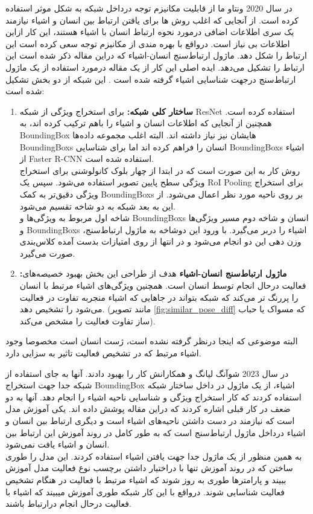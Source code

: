 در سال 2020 ونتاو ما %
\cite{Human_object_relation_action}
 از قابلیت مکانیزم توجه درداخل شبکه به شکل موثر استفاده کرده است. از آنجایی که اغلب روش ها برای یافتن ارتباط بین انسان و اشیاء نیازمند یک سری اطلاعات اضافی درمورد نحوه ارتباط انسان با اشیاء هستند،‌ این کار ازاین اطلاعات بی نیاز است. درواقع با بهره مندی از مکانیزم توجه سعی کرده است این ارتباط را شکل دهد. ماژول ارتباط‌سنج انسان-اشیاء که دراین مقاله ذکر شده است این ارتباط را تشکیل می‌دهد.
 ایده اصلی این کار از یک مقاله درمورد استفاده از یک ماژول ارتباط‌سنج درجهت شناسایی اشیاء گرفته شده است %
 \cite{Relation_network_object}
 . این شبکه از دو بخش تشکیل شده است:
\begin{enumerate}
 	\item \textbf{ساختار کلی شبکه:}
برای استخراج ویژگی از شبکه ResNet %
\cite{Resnet_article}
استفاده کرده است. همچنین از آنجایی که اطلاعات انسان و اشیاء را باهم ترکیب کرده اند،‌ به %
\gls{BoundingBox}
هایشان نیز نیاز داشته اند. البته اغلب مجموعه داده‌ها 
\glspl{BoundingBox}
 انسان را فراهم کرده اند اما برای شناسایی 
\glspl{BoundingBox}
  اشیاء از Faster R-CNN استفاده شده است.\\
روش کار به این صورت است که در ابتدا از چهار بلوک کانولوشنی برای استخراج ویژگی سطح پایین تصویر استفاده می‌شود. سپس یک RoI Pooling برای استخراج ویژگی دقیق‌تر به کمک %
\glspl{BoundingBox}
 بر روی ناحیه مورد نظر اعمال می‌شود. از این به بعد شبکه به دو شاخه تقسیم می‌شود.\\
شاخه اول مربوط به ویژگی‌ها و %
\glspl{BoundingBox}
 انسان و شاخه دوم مسیر ویژگی‌ها و %
 \glspl{BoundingBox}
  اشیاء را دربر می‌گیرد. با ورود این دوشاخه به ماژول ارتباط‌سنج،‌ وزن دهی این دو انجام می‌شود و در انتها از روی امتیازات بدست آمده کلاس‌بندی صورت می‌گیرد.
	\vspace{20pt}
 	\item \textbf{:ماژول ارتباط‌سنج انسان-اشیاء}
 هدف از طراحی این بخش بهبود خصیصه‌های فعالیت درحال انجام توسط انسان است. همچنین ویژگی‌های اشیاء مرتبط با انسان را پررنگ تر می‌کند که شبکه بتواند در جاهایی که اشیاء منجربه تفاوت در فعالیت می‌شود را تشخیص دهد. (مانند تصویر %
\ref{fig:similar_pose_diff}
 که مسواک یا حباب ساز تفاوت فعالیت را مشخص می‌کند).\\
\end{enumerate}
 البته موضوعی که اینجا درنظر گرفته نشده است،‌ ژست انسان است مخصوصا وجود اشیاء مرتبط که در تشخیص فعالیت تاثیر به سزایی دارد.
  
	در سال 2023 شوآنگ لیانگ و همکارانش %
\cite{relation_with_free_obj}
کار %
\cite{Human_object_relation_action}
را بهبود دادند. آنها به‌ جای استفاده از شبکه جدا جهت استخراج %
\gls{BoundingBox}
اشیاء، از یک ماژول در داخل ساختار شبکه استفاده کردند که کار استخراج ویژگی و شناسایی ناحیه اشیاء را انجام دهد. آنها به دو ضعف در کار قبلی اشاره کردند که دراین مقاله پوشش داده اند. یکی آموزش مدل است که نیازمند در دست داشتن ناحیه‌های اشیاء است و دیگری ارتباط بین انسان و اشیاء درداخل ماژول ارتباط‌سنج است که به طور کامل در روند آموزش این ارتباط بین انسان و اشیاء یافت نمی‌شود.\\
به همین منظور از یک ماژول جدا جهت یافتن اشیاء استفاده کردند. این مدل را طوری ساختن که در روند آموزش تنها با دراختیار داشتن برچسب نوع فعالیت مدل آموزش ببیند و پارامتر‌ها طوری به روز شوند که اشیاء مرتبط با فعالیت در هنگام تشخیص فعالیت شناسایی شوند. درواقع با این کار شبکه طوری آموزش میبیند که اشیاء با فعالیت درحال انجام درارتباط باشند.
